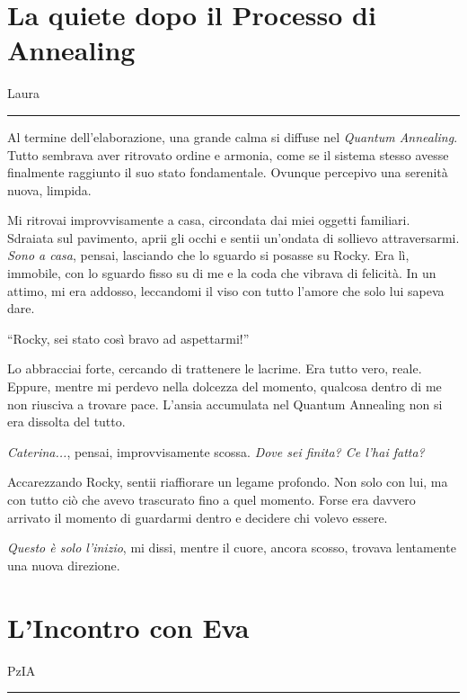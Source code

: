 \section{La quiete dopo il Processo di Annealing}
\vspace{1em}
\begin{center}Laura\end{center}
\hrule
\vspace{1em}

Al termine dell’elaborazione, una grande calma si diffuse nel \textit{Quantum Annealing}. Tutto sembrava aver ritrovato ordine e armonia, come se il sistema stesso avesse finalmente raggiunto il suo stato fondamentale. Ovunque percepivo una serenità nuova, limpida.

Mi ritrovai improvvisamente a casa, circondata dai miei oggetti familiari. Sdraiata sul pavimento, aprii gli occhi e sentii un’ondata di sollievo attraversarmi. \emph{Sono a casa}, pensai, lasciando che lo sguardo si posasse su Rocky. Era lì, immobile, con lo sguardo fisso su di me e la coda che vibrava di felicità. In un attimo, mi era addosso, leccandomi il viso con tutto l’amore che solo lui sapeva dare.

\begin{dialogue}
 \enquote{Rocky, sei stato così bravo ad aspettarmi!}
\end{dialogue}

Lo abbracciai forte, cercando di trattenere le lacrime. Era tutto vero, reale. Eppure, mentre mi perdevo nella dolcezza del momento, qualcosa dentro di me non riusciva a trovare pace. L’ansia accumulata nel Quantum Annealing non si era dissolta del tutto.

\emph{Caterina...}, pensai, improvvisamente scossa. \emph{Dove sei finita? Ce l’hai fatta?}

Accarezzando Rocky, sentii riaffiorare un legame profondo. Non solo con lui, ma con tutto ciò che avevo trascurato fino a quel momento. Forse era davvero arrivato il momento di guardarmi dentro e decidere chi volevo essere.

\emph{Questo è solo l’inizio}, mi dissi, mentre il cuore, ancora scosso, trovava lentamente una nuova direzione.

\section{L'Incontro con Eva}
\vspace{1em}
\begin{center}PzIA\end{center}
\hrule
\vspace{1em}


